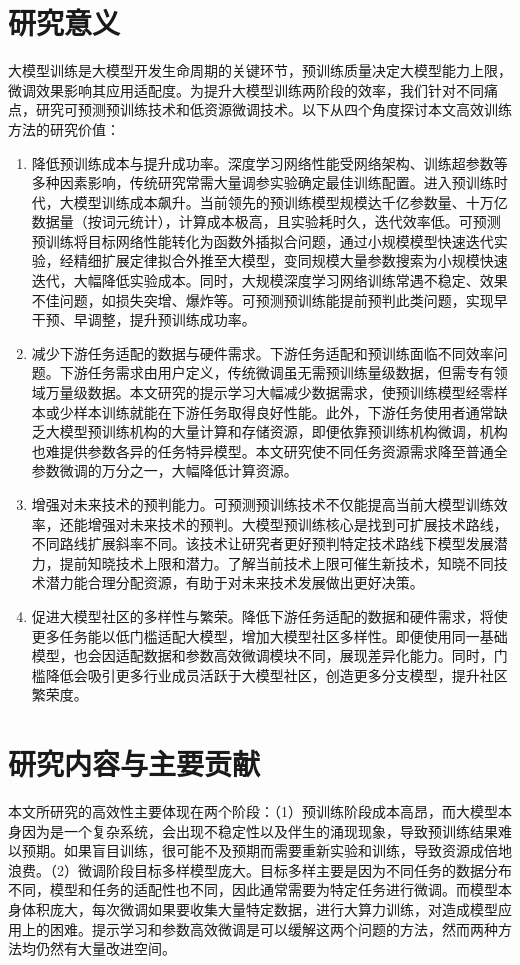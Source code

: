 \section{研究意义}
大模型训练是大模型开发生命周期的关键环节，预训练质量决定大模型能力上限，微调效果影响其应用适配度。为提升大模型训练两阶段的效率，我们针对不同痛点，研究可预测预训练技术和低资源微调技术。以下从四个角度探讨本文高效训练方法的研究价值：

\begin{enumerate}
  \item 降低预训练成本与提升成功率。深度学习网络性能受网络架构、训练超参数等多种因素影响，传统研究常需大量调参实验确定最佳训练配置。进入预训练时代，大模型训练成本飙升。当前领先的预训练模型规模达千亿参数量、十万亿数据量（按词元统计），计算成本极高，且实验耗时久，迭代效率低。可预测预训练将目标网络性能转化为函数外插拟合问题，通过小规模模型快速迭代实验，经精细扩展定律拟合外推至大模型，变同规模大量参数搜索为小规模快速迭代，大幅降低实验成本。同时，大规模深度学习网络训练常遇不稳定、效果不佳问题，如损失突增、爆炸等。可预测预训练能提前预判此类问题，实现早干预、早调整，提升预训练成功率。
  \item 减少下游任务适配的数据与硬件需求。下游任务适配和预训练面临不同效率问题。下游任务需求由用户定义，传统微调虽无需预训练量级数据，但需专有领域万量级数据。本文研究的提示学习大幅减少数据需求，使预训练模型经零样本或少样本训练就能在下游任务取得良好性能。此外，下游任务使用者通常缺乏大模型预训练机构的大量计算和存储资源，即便依靠预训练机构微调，机构也难提供参数各异的任务特异模型。本文研究使不同任务资源需求降至普通全参数微调的万分之一，大幅降低计算资源。
  \item 增强对未来技术的预判能力。可预测预训练技术不仅能提高当前大模型训练效率，还能增强对未来技术的预判。大模型预训练核心是找到可扩展技术路线，不同路线扩展斜率不同。该技术让研究者更好预判特定技术路线下模型发展潜力，提前知晓技术上限和潜力。了解当前技术上限可催生新技术，知晓不同技术潜力能合理分配资源，有助于对未来技术发展做出更好决策。
  \item 促进大模型社区的多样性与繁荣。降低下游任务适配的数据和硬件需求，将使更多任务能以低门槛适配大模型，增加大模型社区多样性。即便使用同一基础模型，也会因适配数据和参数高效微调模块不同，展现差异化能力。同时，门槛降低会吸引更多行业成员活跃于大模型社区，创造更多分支模型，提升社区繁荣度。
\end{enumerate}


\section{研究内容与主要贡献}
本文所研究的高效性主要体现在两个阶段：（1）预训练阶段成本高昂，而大模型本身因为是一个复杂系统，会出现不稳定性以及伴生的涌现现象，导致预训练结果难以预期。如果盲目训练，很可能不及预期而需要重新实验和训练，导致资源成倍地浪费。（2）微调阶段目标多样模型庞大。目标多样主要是因为不同任务的数据分布不同，模型和任务的适配性也不同，因此通常需要为特定任务进行微调。而模型本身体积庞大，每次微调如果要收集大量特定数据，进行大算力训练，对造成模型应用上的困难。提示学习和参数高效微调是可以缓解这两个问题的方法，然而两种方法均仍然有大量改进空间。

